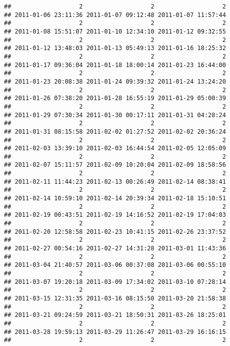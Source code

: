 \documentclass[]{article}
\begin{document}
\begin{verbatim}
##                   2                   2                   2 
## 2011-01-06 23:11:36 2011-01-07 09:12:48 2011-01-07 11:57:44 
##                   2                   2                   2 
## 2011-01-08 15:51:07 2011-01-10 12:34:10 2011-01-12 09:32:55 
##                   2                   2                   2 
## 2011-01-12 13:48:03 2011-01-13 05:49:13 2011-01-16 18:25:32 
##                   2                   2                   2 
## 2011-01-17 09:36:04 2011-01-18 18:00:14 2011-01-23 16:44:00 
##                   2                   2                   2 
## 2011-01-23 20:08:38 2011-01-24 09:39:32 2011-01-24 13:24:20 
##                   2                   2                   2 
## 2011-01-26 07:38:20 2011-01-28 16:55:19 2011-01-29 05:00:39 
##                   2                   2                   2 
## 2011-01-29 07:30:34 2011-01-30 00:17:11 2011-01-31 04:28:24 
##                   2                   2                   2 
## 2011-01-31 08:15:58 2011-02-02 01:27:52 2011-02-02 20:36:24 
##                   2                   2                   2 
## 2011-02-03 13:39:10 2011-02-03 16:44:54 2011-02-05 12:05:09 
##                   2                   2                   2 
## 2011-02-07 15:11:57 2011-02-09 10:20:04 2011-02-09 18:58:56 
##                   2                   2                   2 
## 2011-02-11 11:44:23 2011-02-13 00:26:49 2011-02-14 08:38:41 
##                   2                   2                   2 
## 2011-02-14 10:59:10 2011-02-14 20:39:34 2011-02-18 15:10:51 
##                   2                   2                   2 
## 2011-02-19 00:43:51 2011-02-19 14:16:52 2011-02-19 17:04:03 
##                   2                   2                   2 
## 2011-02-20 12:58:58 2011-02-23 10:41:15 2011-02-26 23:37:52 
##                   2                   2                   2 
## 2011-02-27 00:54:16 2011-02-27 14:31:28 2011-03-01 11:43:36 
##                   2                   2                   2 
## 2011-03-04 21:40:57 2011-03-06 00:37:08 2011-03-06 00:55:10 
##                   2                   2                   2 
## 2011-03-07 19:20:18 2011-03-09 17:34:02 2011-03-10 07:28:14 
##                   2                   2                   2 
## 2011-03-15 12:31:35 2011-03-16 08:15:50 2011-03-20 21:58:38 
##                   2                   2                   2 
## 2011-03-21 09:24:59 2011-03-21 18:50:31 2011-03-26 18:25:01 
##                   2                   2                   2 
## 2011-03-28 19:59:13 2011-03-29 11:26:47 2011-03-29 16:16:15 
##                   2                   2                   2 

\end{verbatim}
\end{document}
